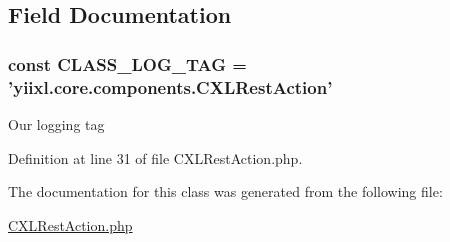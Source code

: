 \subsection{Field Documentation}
\hypertarget{classCXLRestAction_aa607ab5e557e6ebb60b85c5a20ad067f}{
\subsubsection[{CLASS\_\-LOG\_\-TAG}]{\setlength{\rightskip}{0pt plus 5cm}const {\bf CLASS\_\-LOG\_\-TAG} = 'yiixl.core.components.CXLRestAction'}}
\label{classCXLRestAction_aa607ab5e557e6ebb60b85c5a20ad067f}
Our logging tag 

Definition at line 31 of file CXLRestAction.php.



The documentation for this class was generated from the following file:\begin{DoxyCompactItemize}
\item 
\hyperlink{CXLRestAction_8php}{CXLRestAction.php}\end{DoxyCompactItemize}
